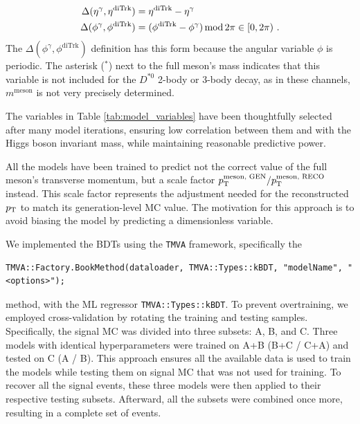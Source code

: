 \begin{myitemlist}
    \begin{equation*}
        \begin{aligned}
        \Delta(\eta^{\gamma}, \eta^{\text{diTrk}}) &= \eta^{\text{diTrk}} - \eta^{\gamma} \\
        \Delta(\phi^{\gamma}, \phi^{\text{diTrk}}) &= (\phi^{\text{diTrk}} - \phi^{\gamma}) \operatorname{mod} 2\pi \in[0, 2\pi)\ .
        \end{aligned}
    \end{equation*}
    The $\Delta(\phi^{\gamma}, \phi^{\text{diTrk}})$ definition has this form because the angular variable $\phi$ is periodic. The asterisk ($^*$) next to the full meson's mass indicates that this variable is not included for the $D^{*0}$ 2-body or 3-body decay, as in these channels, $m^{\text{meson}}$ is not very precisely determined.

    The variables in Table \ref{tab:model_variables} have been thoughtfully selected after many model iterations, ensuring low correlation between them and with the Higgs boson invariant mass, while maintaining reasonable predictive power.

    All the models have been trained to predict not the correct value of the full meson's transverse momentum, but a scale factor $p_\text{T}^{\text{meson, GEN}}/p_\text{T}^{\text{meson, RECO}}$ instead. This scale factor represents the adjustment needed for the reconstructed $p_\text{T}$ to match its generation-level MC value. The motivation for this approach is to avoid biasing the model by predicting a dimensionless variable.

    We implemented the BDTs using the \verb+TMVA+ framework, specifically the
\begin{small}
\vspace*{-6pt}
\begin{verbatim}
TMVA::Factory.BookMethod(dataloader, TMVA::Types::kBDT, "modelName", "<options>");
\end{verbatim}
\vspace*{-6pt}
\end{small}
    method, with the ML regressor \verb+TMVA::Types::kBDT+. To prevent overtraining, we employed cross-validation by rotating the training and testing samples. Specifically, the signal MC was divided into three subsets: A, B, and C. Three models with identical hyperparameters were trained on A+B (B+C / C+A) and tested on C (A / B). This approach ensures all the available data is used to train the models while testing them on signal MC that was not used for training. To recover all the signal events, these three models were then applied to their respective testing subsets. Afterward, all the subsets were combined once more, resulting in a complete set of events.


\end{myitemlist}
